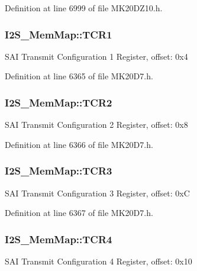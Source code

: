 Definition at line 6999 of file M\+K20\+D\+Z10.\+h.

\subsubsection[{\texorpdfstring{T\+C\+R1}{TCR1}}]{ I2\+S\+\_\+\+Mem\+Map\+::\+T\+C\+R1}\hypertarget{struct_i2_s___mem_map_a1e90b98887869de05cc981b80e2f50b4}{}\label{struct_i2_s___mem_map_a1e90b98887869de05cc981b80e2f50b4}
S\+AI Transmit Configuration 1 Register, offset\+: 0x4 

Definition at line 6365 of file M\+K20\+D7.\+h.

\subsubsection[{\texorpdfstring{T\+C\+R2}{TCR2}}]{ I2\+S\+\_\+\+Mem\+Map\+::\+T\+C\+R2}\hypertarget{struct_i2_s___mem_map_aa3e215825b6d333e5ee6ef35541b0474}{}\label{struct_i2_s___mem_map_aa3e215825b6d333e5ee6ef35541b0474}
S\+AI Transmit Configuration 2 Register, offset\+: 0x8 

Definition at line 6366 of file M\+K20\+D7.\+h.

\subsubsection[{\texorpdfstring{T\+C\+R3}{TCR3}}]{ I2\+S\+\_\+\+Mem\+Map\+::\+T\+C\+R3}\hypertarget{struct_i2_s___mem_map_a98ceb21993839e209a3634870391b6a7}{}\label{struct_i2_s___mem_map_a98ceb21993839e209a3634870391b6a7}
S\+AI Transmit Configuration 3 Register, offset\+: 0xC 

Definition at line 6367 of file M\+K20\+D7.\+h.

\subsubsection[{\texorpdfstring{T\+C\+R4}{TCR4}}]{ I2\+S\+\_\+\+Mem\+Map\+::\+T\+C\+R4}\hypertarget{struct_i2_s___mem_map_a933a94f14922497e04bd3178585e6288}{}\label{struct_i2_s___mem_map_a933a94f14922497e04bd3178585e6288}
S\+AI Transmit Configuration 4 Register, offset\+: 0x10 

